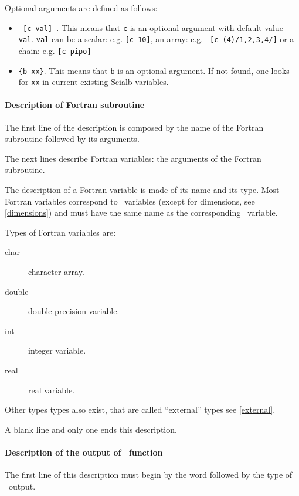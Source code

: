 Optional arguments are defined as follows:
\begin{itemize}
\item{
\verb! [c val] !. This means that \verb!c! is an optional argument with
default value \verb!val!.  \verb!val! can be a scalar: e.g. \verb![c 10]!, 
an array: e.g. \verb! [c (4)/1,2,3,4/]! or a chain: e.g. \verb![c pipo]! 
}
\item{
\verb!{b xx}!. This means that \verb!b! is an optional argument.
If not found, one looks for \verb!xx! in current existing Scialb variables.
}
\end{itemize}

\paragraph{Description of Fortran subroutine}
\label{Fortran}

The first line of the description is composed by the name of the 
Fortran subroutine followed by its arguments.

The next lines describe Fortran variables: the arguments of the Fortran
subroutine. 

The description of a Fortran variable is made of its name and its type.
Most Fortran variables correspond to \SCI\ variables (except for
dimensions, see \ref{dimensions}) and must have the same name as the
corresponding \SCI\ variable.

\smallskip

Types of Fortran variables are:
\begin{description}
  \item[char] character array.
  \item[double] double precision variable.
  \item[int] integer variable.
  \item[real] real variable.
\end{description}

Other types types also exist, that are called ``external'' types see \ref{external}.

\smallskip

A blank line and only one ends this description.

\paragraph{Description of the output of \SCI\ function}
\label{output}

The first line of this description must begin by the word  followed
by the type of \SCI\ output.

